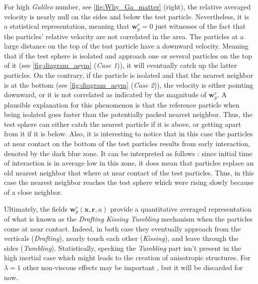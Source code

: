 

For high \textit{Galileo} number, see \ref{fig:Why_Ga_matter} (right), the relative averaged velocity is nearly null on the sides and below the test particle. 
Nevertheless, it is a statistical representation, meaning that $\textbf{w}_p^r = 0$ just witnesses of the fact that the particles' relative velocity are not correlated in the area. 
The particles at a large distance on the top of the test particle have a downward velocity. 
Meaning that if the test sphere is isolated and approach one or several  particles on the top of it (see \ref{fig:diagram_asym} (\textit{Case 1})), it will eventually catch up the latter particles. 
On the contrary, if the particle is isolated and that the nearest neighbor is at the bottom (see \ref{fig:diagram_asym} (\textit{Case 2})), the velocity is either pointing downward, or it is not correlated as indicated by the magnitude of $\textbf{w}_p^r$. 
A plausible explanation for this phenomenon is that the reference particle when being isolated goes faster than the potentially packed nearest neighbor.
Thus, the test sphere can either catch the nearest particle if it is above, or getting apart from it if it is below.
Also, it is interesting to notice that in this case the particles at near contact on the bottom of the test particles results from early interaction, denoted by the dark blue zone. 
It can be interpreted as follows : since 
initial time of interaction is in average low in this zone, it does mean that particles replace an old nearest neighbor that where at near contact of the test particles. 
Thus, in this case the nearest neighbor reaches the test sphere which were rising slowly because of a close neighbor. 

Ultimately, the fields $\textbf{w}^r_p(\textbf{x},\textbf{r}, a)$ provide a quantitative averaged representation of what is known as the \textit{Drafting Kissing Tumbling} \citep{fortes1987nonlinear} mechanism when the particles come at near contact. 
Indeed, in both case they eventually approach from the verticals (\textit{Drafting}), nearly touch each other (\textit{Kissing}), and leave through the sides (\textit{Tumbling}). 
Statistically, specking the \textit{Tumbling} part isn't present in the high inertial case which might leads to the creation of anisotropic structures. 
For $\lambda = 1$ other non-viscous effects may be important \citet{legendre2003hydrodynamic}, but it will be discarded for now.

